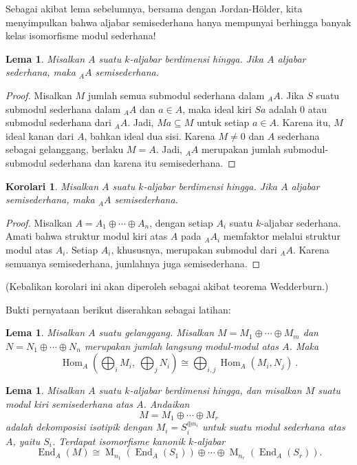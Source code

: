\documentclass[12pt]{article}
\theoremstyle{plain}
\newtheorem{lemma}[theorem]{Lema}
\newtheorem{corollary}[theorem]{Korolari}
\theoremstyle{definition}
\theoremstyle{remark}
\numberwithin{equation}{section}
\begin{document}
Sebagai akibat lema sebelumnya, bersama dengan
Jordan-H\"older, kita menyimpulkan bahwa aljabar semisederhana hanya mempunyai
berhingga banyak kelas isomorfisme modul sederhana!

\begin{lemma}
Misalkan $A$ suatu $k$-aljabar berdimensi hingga.
Jika $A$ aljabar sederhana, maka ${}_AA$ semisederhana.
\end{lemma}

\begin{proof}
Misalkan $M$ jumlah semua submodul sederhana dalam ${}_AA$.
Jika $S$ suatu submodul sederhana dalam ${}_AA$ dan $a \in A$, maka ideal
kiri $Sa$ adalah $0$ atau submodul sederhana dari ${}_AA$.
Jadi, $Ma \subseteq M$ untuk setiap $a \in A$.
Karena itu, $M$ ideal kanan dari $A$, bahkan ideal dua sisi.
Karena $M \ne 0$ dan $A$ sederhana sebagai gelanggang, berlaku $M=A$.
Jadi, ${}_AA$ merupakan jumlah submodul-submodul sederhana dan karena itu semisederhana.
\end{proof}

\begin{corollary} \label{cor:semisimple_def}
Misalkan $A$ suatu $k$-aljabar berdimensi hingga.
Jika $A$ aljabar semisederhana, maka ${}_AA$ semisederhana.
\end{corollary}

\begin{proof}
Misalkan $A = A_1 \oplus \cdots \oplus A_n$, dengan setiap $A_i$ suatu
$k$-aljabar sederhana. Amati bahwa struktur modul kiri atas $A$ pada ${}_AA_i$
memfaktor melalui struktur modul atas $A_i$.
Setiap $A_i$, khususnya, merupakan submodul dari ${}_AA$.
Karena semuanya semisederhana, jumlahnya juga semisederhana.
\end{proof}

(Kebalikan korolari ini akan diperoleh sebagai akibat
teorema Wedderburn.)

Bukti pernyataan berikut diserahkan sebagai latihan:

\begin{lemma} \label{lem:fancyMatrix}
Misalkan $A$ suatu gelanggang.
Misalkan $M= M_1 \oplus \cdots \oplus M_m$ dan
$N=N_1 \oplus \cdots \oplus N_n$ merupakan jumlah langsung modul-modul atas $A$.
Maka
\[ \operatorname{Hom}_A\left(\bigoplus_iM_i,\ \bigoplus_jN_i\right)
\cong \bigoplus_{i,j}\operatorname{Hom}_A(M_i, N_j) \ . \]
\end{lemma}

\begin{lemma}
Misalkan $A$ suatu $k$-aljabar berdimensi hingga, dan
misalkan $M$ suatu modul kiri semisederhana atas $A$.
Andaikan
\[
M = M_1 \oplus \cdots \oplus M_r
\]
adalah dekomposisi isotipik dengan $M_i=S_i^{\oplus n_i}$
untuk suatu modul sederhana atas $A$, yaitu $S_i$.
Terdapat isomorfisme kanonik $k$-aljabar
\[
\operatorname{End}_A(M) \cong \operatorname{M}_{n_1}(\operatorname{End}_A(S_1))
\oplus \cdots \oplus
\operatorname{M}_{n_r}(\operatorname{End}_A(S_r)) .
\]
\end{lemma}
\end{document}
